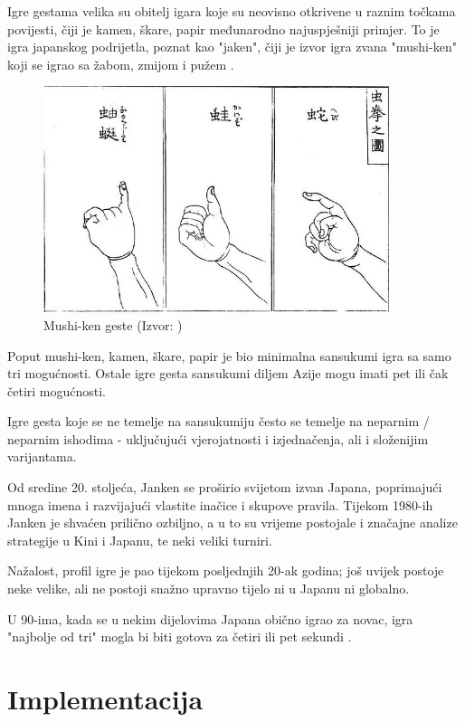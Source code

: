 \documentclass{foi}
\begin{document}
Igre gestama velika su obitelj igara koje su neovisno otkrivene u raznim točkama povijesti, čiji je kamen, škare, papir međunarodno najuspješniji primjer. To je igra japanskog podrijetla, poznat kao "jaken", čiji je izvor igra zvana "mushi-ken" koji se igrao sa žabom, zmijom i pužem \cite{towardsAI2020}.

\begin{figure}[h!]
    \centering
    \includegraphics[width=0.9\textwidth]{slike/slika1.jpg}
    \caption{Mushi-ken geste (Izvor: \cite{towardsAI2020})}
\end{figure}

Poput mushi-ken, kamen, škare, papir je bio minimalna sansukumi igra sa samo tri mogućnosti. Ostale igre gesta sansukumi diljem Azije mogu imati pet ili čak četiri mogućnosti.

Igre gesta koje se ne temelje na sansukumiju često se temelje na neparnim / neparnim ishodima - uključujući vjerojatnosti i izjednačenja, ali i složenijim varijantama.

Od sredine 20. stoljeća, Janken se proširio svijetom izvan Japana, poprimajući mnoga imena i razvijajući vlastite inačice i skupove pravila. Tijekom 1980-ih Janken je shvaćen prilično ozbiljno, a u to su vrijeme postojale i značajne analize strategije u Kini i Japanu, te neki veliki turniri.

Nažalost, profil igre je pao tijekom posljednjih 20-ak godina; još uvijek postoje neke velike, ali ne postoji snažno upravno tijelo ni u Japanu ni globalno.

U 90-ima, kada se u nekim dijelovima Japana obično igrao za novac, igra "najbolje od tri" mogla bi biti gotova za četiri ili pet sekundi \cite{towardsAI2020}.

\section{Implementacija}
\end{document}
